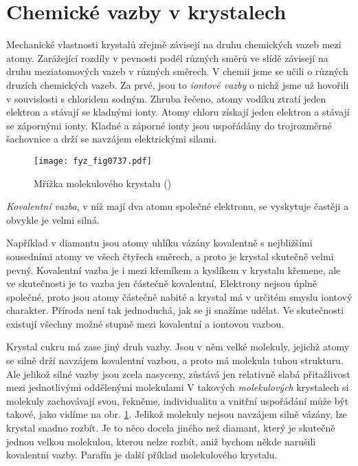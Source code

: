   \section{Chemické vazby v krystalech}\label{fyz:IIchapXXXsecII}
    Mechanické vlastnosti krystalů zřejmě závisejí na druhu chemických vazeb mezi atomy. Zarážející 
    rozdíly v pevnosti podél různých směrů ve slídě závisejí na druhu meziatomových vazeb v různých 
    směrech. V chemii jsme se učili o různých druzích chemických vazeb. Za prvé, jsou to 
    \emph{iontové vazby} o nichž jsme už hovořili v souvislosti s chloridem sodným. Zhruba řečeno, 
    atomy vodíku ztratí jeden elektron a stávají se kladnými ionty. Atomy chloru získají jeden 
    elektron a stávají se zápornými ionty. Kladné a záporné ionty jsou uspořádány do trojrozměrné 
    šachovnice a drží se navzájem elektrickými silami. 
    
    \begin{figure}[ht!] %
      \centering
      \texttt{[image: fyz\_fig0737.pdf]}
      \caption{Mřížka molekulového krystalu 
               (\cite[s.~546]{Feynman02})}
      \label{fyz:fig0737}
    \end{figure}
    
    \emph{Kovalentní vazba}, v níž mají dva atomu společné elektronu, se vyskytuje častěji a 
    obvykle je velmi silná. 
    
    Například v diamantu jsou atomy uhlíku vázány kovalentně s nejbližšími sousedními atomy ve 
    všech čtyřech směrech, a proto je krystal skutečně velmi pevný. Kovalentní vazba je i mezi 
    křemíkem a kyslíkem v krystalu křemene, ale ve skutečnosti je to vazba jen částečně kovalentní, 
    Elektrony nejsou úplně společné, proto jsou atomy částečně nabité a krystal má v určitém smyslu 
    iontový charakter. Příroda není tak jednoduchá, jak se ji snažíme udělat. Ve skutečnosti 
    existují všechny možné stupně mezi kovalentní a iontovou vazbou.

    Krystal cukru má zase jiný druh vazby. Jsou v něm velké molekuly, jejichž atomy se silně drží 
    navzájem kovalentní vazbou, a proto má molekula tuhou strukturu. Ale jelikož silné vazby jsou 
    zcela nasyceny, zůstává jen relativně slabá přitažlivost mezi jednotlivými oddělenými 
    molekulami V takových \emph{molekulových} krystalech si molekuly zachovávají svou, řekněme, 
    individualitu a vnitřní uspořádání může být takové, jako vidíme na obr. \ref{fyz:fig0737}. 
    Jelikož molekuly nejsou navzájem silně vázány, lze krystal snadno rozbít. Je to něco docela 
    jiného než diamant, který je skutečně jednou velkou molekulou, kterou nelze rozbít, aniž bychom 
    někde narušili kovalentní vazby. Parafín je další příklad molekulového krystalu.
    
